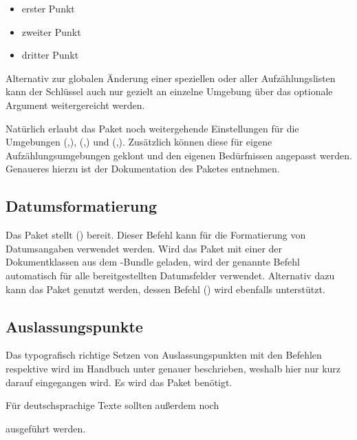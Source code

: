 \documentclass[%
  english,ngerman,%
  cdgeometry=no,DIV=12,automark%
]{tudscrartcl}
\begin{document}
\begin{Preamble*}

\end{Preamble*}
\begin{Hint*}
\begin{itemize}
\item erster Punkt
\item zweiter Punkt
\item dritter Punkt
\end{itemize}

\end{Hint*}
%
Alternativ zur globalen Änderung einer speziellen oder aller Aufzählungslisten 
kann der Schlüssel  auch nur gezielt an einzelne Umgebung 
über das optionale Argument weitergereicht werden.

Natürlich erlaubt das Paket noch weitergehende Einstellungen für die Umgebungen 
(,),
(,) und
(,). 
Zusätzlich können diese für eigene Aufzählungsumgebungen geklont und den 
eigenen Bedürfnissen angepasst werden. Genaueres hierzu ist der Dokumentation 
des Paketes  entnehmen.


\subsection{Datumsformatierung}
Das Paket  stellt () bereit. 
Dieser Befehl kann für die Formatierung von Datumsangaben verwendet werden. 
Wird das Paket mit einer der Dokumentklassen aus dem \TUDScript-Bundle geladen, 
wird der genannte Befehl automatisch für alle bereitgestellten Datumsfelder 
verwendet. Alternativ dazu kann das Paket  genutzt werden, 
dessen Befehl () wird ebenfalls unterstützt.
%
\begin{Preamble}
\usepackage{isodate}

\end{Preamble}


\subsection{Auslassungspunkte}
Das typografisch richtige Setzen von Auslassungspunkten mit den Befehlen 
 respektive  wird im Handbuch unter 
 genauer 
beschrieben, weshalb hier nur kurz darauf eingegangen wird. Es wird das Paket 
 benötigt.
%
\begin{Preamble}
\usepackage{ellipsis}
\end{Preamble}
%
Für deutschsprachige Texte sollten außerdem noch 
%
\begin{Preamble}
\let\ellipsispunctuation\relax

\end{Preamble}
%
ausgeführt werden.
\end{document}
